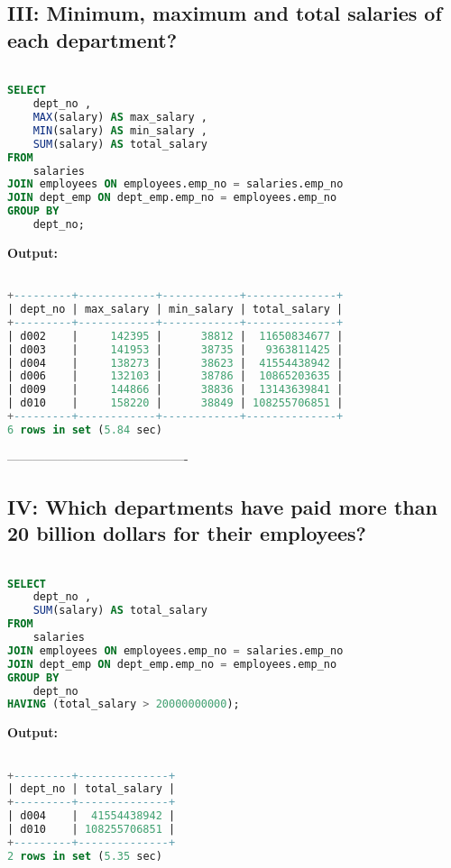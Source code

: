 \documentclass[12pt]{report}
\begin{document}
\subsection*{III: Minimum, maximum and total salaries of each department?}

\begin{lstlisting}[language=sql]

SELECT
	dept_no ,
	MAX(salary) AS max_salary ,
	MIN(salary) AS min_salary ,
	SUM(salary) AS total_salary
FROM
	salaries
JOIN employees ON employees.emp_no = salaries.emp_no
JOIN dept_emp ON dept_emp.emp_no = employees.emp_no
GROUP BY
	dept_no;
\end{lstlisting}
\textbf{Output:}

\begin{lstlisting}[language=sql]

+---------+------------+------------+--------------+
| dept_no | max_salary | min_salary | total_salary |
+---------+------------+------------+--------------+
| d002    |     142395 |      38812 |  11650834677 |
| d003    |     141953 |      38735 |   9363811425 |
| d004    |     138273 |      38623 |  41554438942 |
| d006    |     132103 |      38786 |  10865203635 |
| d009    |     144866 |      38836 |  13143639841 |
| d010    |     158220 |      38849 | 108255706851 |
+---------+------------+------------+--------------+
6 rows in set (5.84 sec)
\end{lstlisting}

-------------------------------------------

\subsection*{IV: Which departments have paid more than 20 billion dollars for their employees?}
\begin{lstlisting}[language=sql]

SELECT
	dept_no ,
	SUM(salary) AS total_salary
FROM
	salaries
JOIN employees ON employees.emp_no = salaries.emp_no
JOIN dept_emp ON dept_emp.emp_no = employees.emp_no
GROUP BY
	dept_no
HAVING (total_salary > 20000000000);

\end{lstlisting}

\textbf{Output:}

\begin{lstlisting}[language=sql]

+---------+--------------+
| dept_no | total_salary |
+---------+--------------+
| d004    |  41554438942 |
| d010    | 108255706851 |
+---------+--------------+
2 rows in set (5.35 sec)


\end{lstlisting}
\end{document}
